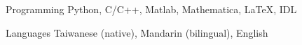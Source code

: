 


\begin{cvskills}


\cvskill
{Programming} %
{Python, C/C++, Matlab, Mathematica, LaTeX, IDL} %


\cvskill
{Languages} %
{Taiwanese (native), Mandarin (bilingual), English} %


\end{cvskills}
